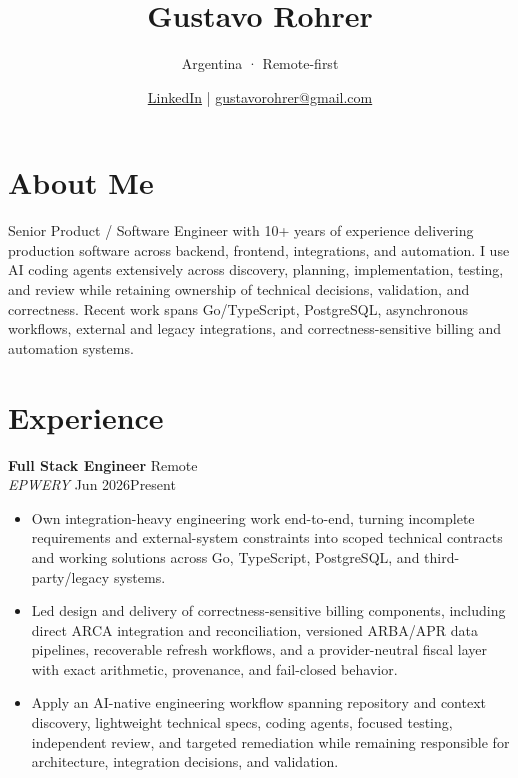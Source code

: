 \documentclass[10pt,a4paper]{article}
\newcommand{\roleentry}[4]{%
  \textbf{#1} \hfill {\small #3}\\[-0.2em]
  {\itshape #2} \hfill {\small #4}\\[-0.35em]
}
\begin{document}
\title{Gustavo Rohrer}
\author{Argentina · Remote-first}
\date{\vspace{-1.1em}\small \href{https://www.linkedin.com/in/gustavo-rohrer}{LinkedIn} \;|\; \href{mailto:gustavorohrer@gmail.com}{gustavorohrer@gmail.com}}
\maketitle

\section*{About Me}
Senior Product / Software Engineer with 10+ years of experience delivering production software across backend, frontend, integrations, and automation. I use AI coding agents extensively across discovery, planning, implementation, testing, and review while retaining ownership of technical decisions, validation, and correctness. Recent work spans Go/TypeScript, PostgreSQL, asynchronous workflows, external and legacy integrations, and correctness-sensitive billing and automation systems.

\section*{Experience}

\roleentry{Full Stack Engineer}{EPWERY}{Remote}{Jun 2026\textendash{}Present}
\begin{itemize}
  \item Own integration-heavy engineering work end-to-end, turning incomplete requirements and external-system constraints into scoped technical contracts and working solutions across Go, TypeScript, PostgreSQL, and third-party/legacy systems.
  \item Led design and delivery of correctness-sensitive billing components, including direct ARCA integration and reconciliation, versioned ARBA/APR data pipelines, recoverable refresh workflows, and a provider-neutral fiscal layer with exact arithmetic, provenance, and fail-closed behavior.
  \item Apply an AI-native engineering workflow spanning repository and context discovery, lightweight technical specs, coding agents, focused testing, independent review, and targeted remediation while remaining responsible for architecture, integration decisions, and validation.
\end{itemize}
\end{document}
